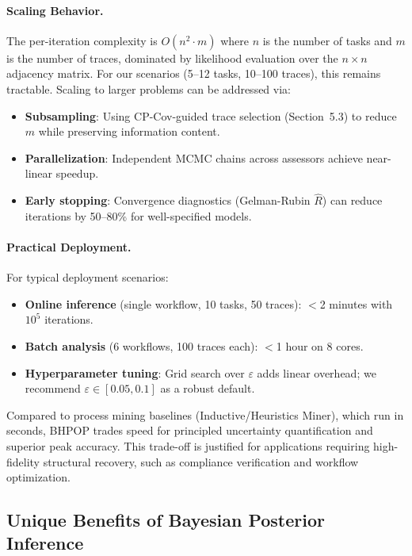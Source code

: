 \paragraph{Scaling Behavior.}
The per-iteration complexity is $O(n^2 \cdot m)$ where $n$ is the number of tasks and $m$ is the number of traces, dominated by likelihood evaluation over the $n \times n$ adjacency matrix. For our scenarios (5--12 tasks, 10--100 traces), this remains tractable. Scaling to larger problems can be addressed via:
\begin{itemize}[leftmargin=*,nosep]
    \item \textbf{Subsampling}: Using CP-Cov-guided trace selection (Section~5.3) to reduce $m$ while preserving information content.
    \item \textbf{Parallelization}: Independent MCMC chains across assessors achieve near-linear speedup.
    \item \textbf{Early stopping}: Convergence diagnostics (Gelman-Rubin $\hat{R}$) can reduce iterations by 50--80\% for well-specified models.
\end{itemize}

\paragraph{Practical Deployment.}
For typical deployment scenarios:
\begin{itemize}[leftmargin=*,nosep]
    \item \textbf{Online inference} (single workflow, 10 tasks, 50 traces): $<$2 minutes with $10^5$ iterations.
    \item \textbf{Batch analysis} (6 workflows, 100 traces each): $<$1 hour on 8 cores.
    \item \textbf{Hyperparameter tuning}: Grid search over $\varepsilon$ adds linear overhead; we recommend $\varepsilon \in [0.05, 0.1]$ as a robust default.
\end{itemize}

Compared to process mining baselines (Inductive/Heuristics Miner), which run in seconds, BHPOP trades speed for principled uncertainty quantification and superior peak accuracy. This trade-off is justified for applications requiring high-fidelity structural recovery, such as compliance verification and workflow optimization.

\subsection{Unique Benefits of Bayesian Posterior Inference}
\label{sec:bayesian_benefits}

